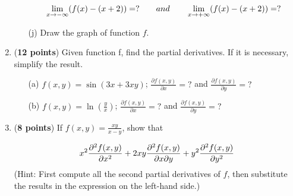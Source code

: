 \documentclass[a4paper]{article}
\begin{document}
\begin{enumerate}
\begin{enumerate}
		\begin{equation}
		\lim_{x \to - \infty}(f(x) - (x+2)) = ? \qquad and \qquad \lim_{x \to + \infty} (f(x) - (x+2)) = ?\notag
		\end{equation}				
		
		\item[(j)] Draw the graph of function $f$.\\
				
		
	\end{enumerate}		
	
	
\item (\textbf{12 points}) Given function f, find the partial derivatives. If it is necessary, simplify the result.\\

	\begin{enumerate}
		\item[(a)] $f(x,y) = \sin(3x + 3xy)$; $\frac{\partial f(x,y)}{\partial x}= ?$ and $\frac{\partial f(x,y)}{\partial y} = ?$\\
		
		\item[(b)] $f(x,y) = \ln(\frac{y}{x})$; $\frac{\partial f(x,y)}{\partial x}= ?$ and $\frac{\partial f(x,y)}{\partial y} = ?$\\
	\end{enumerate}
	
	
\item (\textbf{8 points}) If $f(x,y) = \frac{xy}{x - y}$, show that 

\begin{equation}
	x^2 \frac{\partial^2 f(x,y)}{\partial x^2} + 2xy \frac{\partial^2 f(x,y)}{ \partial x \partial y} + y^2 \frac{\partial^2 f(x,y)}{\partial y^2}\notag
\end{equation}	
(Hint: First compute all the second partial derivatives of $f$, then substitute the results in the expression on the left-hand side.)
	
	
	
\end{enumerate}
\end{document}

